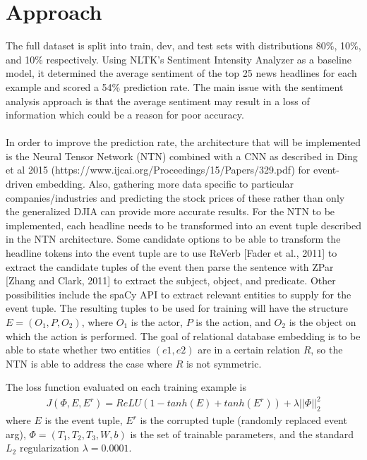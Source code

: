\documentclass{article} %
\begin{document}
\section{Approach}

The full dataset is split into train, dev, and test sets with distributions 80\%, 10\%, and 10\% respectively.
Using NLTK's Sentiment Intensity Analyzer as a baseline model, it determined the average sentiment of the top 25 news headlines for each example and scored a 54\% prediction rate. 
The main issue with the sentiment analysis approach is that the average sentiment may result in a loss of information which could be a reason for poor accuracy.
\\
\\
In order to improve the prediction rate, the architecture that will be implemented is the Neural Tensor Network (NTN) combined with a CNN as described in Ding et al 2015 (https://www.ijcai.org/Proceedings/15/Papers/329.pdf) for event-driven embedding.
Also, gathering more data specific to particular companies/industries and predicting the stock prices of these rather than only the generalized DJIA can provide more accurate results.
For the NTN to be implemented, each headline needs to be transformed into an event tuple described in the NTN architecture.
Some candidate options to be able to transform the headline tokens into the event tuple are to use ReVerb [Fader et al., 2011]
to extract the candidate tuples of the event then parse the sentence with ZPar [Zhang and Clark, 2011] to
extract the subject, object, and predicate.
Other possibilities include the spaCy API to extract relevant entities to supply for the event tuple.
The resulting tuples to be used for training will have the structure $E=(O_1, P, O_2)$, where $O_1$ is the actor,
$P$ is the action, and $O_2$ is the object on which the action is performed.
The goal of relational database embedding is to be able to state whether two entities $(e1, e2)$ are in a certain relation $R$,
so the NTN is able to address the case where $R$ is not symmetric.

The loss function evaluated on each training example is
\begin{align}
  J(\Phi, E, E^r) = ReLU(1 - tanh(E) + tanh(E^r)) + \lambda||\Phi||^2_2
\end{align}
where $E$ is the event tuple, $E^r$ is the corrupted tuple (randomly replaced event arg), $\Phi = (T_1, T_2, T_3, W, b)$
is the set of trainable parameters, and the standard $L_2$ regularization $\lambda = 0.0001$.
\end{document}
